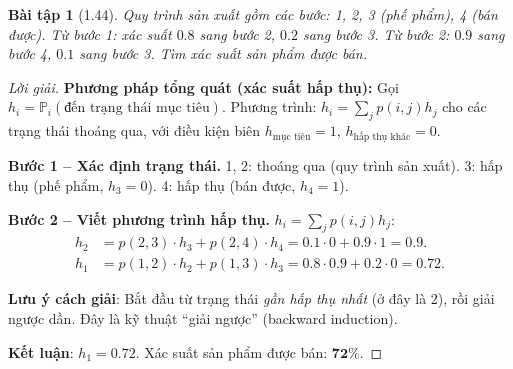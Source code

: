 \documentclass[8pt,a4paper]{article}
\newtheorem{exercise}{Bài tập}
\newenvironment{solution}{\begin{proof}[Lời giải]}{\end{proof}}
\newcommand{\prob}{\mathbb{P}}
\begin{document}
\begin{exercise}[1.44]
Quy trình sản xuất gồm các bước: 1, 2, 3 (phế phẩm), 4 (bán được). Từ bước 1: xác suất $0.8$ sang bước 2, $0.2$ sang bước 3. Từ bước 2: $0.9$ sang bước 4, $0.1$ sang bước 3. Tìm xác suất sản phẩm được bán.
\end{exercise}
\begin{solution}
\textbf{Phương pháp tổng quát (xác suất hấp thụ):} Gọi $h_i = \prob_i(\text{đến trạng thái mục tiêu})$. Phương trình: $h_i = \sum_j p(i,j) h_j$ cho các trạng thái thoáng qua, với điều kiện biên $h_{\text{mục tiêu}} = 1$, $h_{\text{hấp thụ khác}} = 0$.

\textbf{Bước 1 -- Xác định trạng thái.}
1, 2: thoáng qua (quy trình sản xuất). 3: hấp thụ (phế phẩm, $h_3 = 0$). 4: hấp thụ (bán được, $h_4 = 1$).

\textbf{Bước 2 -- Viết phương trình hấp thụ.}
$h_i = \sum_j p(i,j) h_j$:
\begin{align*}
  h_2 &= p(2,3) \cdot h_3 + p(2,4) \cdot h_4 = 0.1 \cdot 0 + 0.9 \cdot 1 = 0.9. \\
  h_1 &= p(1,2) \cdot h_2 + p(1,3) \cdot h_3 = 0.8 \cdot 0.9 + 0.2 \cdot 0 = 0.72.
\end{align*}

\textbf{Lưu ý cách giải}: Bắt đầu từ trạng thái \emph{gần hấp thụ nhất} (ở đây là 2), rồi giải ngược dần. Đây là kỹ thuật ``giải ngược'' (backward induction).

\textbf{Kết luận}: $h_1 = 0.72$. Xác suất sản phẩm được bán: $\mathbf{72\%}$.
\end{solution}
\end{document}
